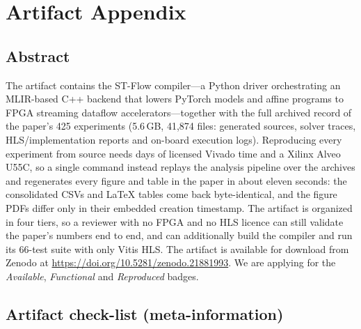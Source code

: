 %
%
%

\appendix
\section{Artifact Appendix}

\subsection{Abstract}

The artifact contains the ST-Flow compiler---a Python driver orchestrating an MLIR-based
C++ backend that lowers PyTorch models and affine programs to FPGA streaming dataflow
accelerators---together with the full archived record of the paper's 425 experiments
(5.6\,GB, 41{,}874 files: generated sources, solver traces, HLS/implementation reports and
on-board execution logs). Reproducing every experiment from source needs days of licensed
Vivado time and a Xilinx Alveo U55C, so a single command instead replays the analysis
pipeline over the archives and regenerates every figure and table in the paper in about
eleven seconds: the consolidated CSVs and \LaTeX{} tables come back byte-identical, and the
figure PDFs differ only in their embedded creation timestamp. The artifact is organized in
four tiers, so a reviewer with no FPGA and no HLS licence can still validate the paper's
numbers end to end, and can additionally build the compiler and run its 66-test suite with
only Vitis HLS. The artifact is available for download from Zenodo at \url{https://doi.org/10.5281/zenodo.21881993}. We are applying for the \emph{Available}, \emph{Functional} and
\emph{Reproduced} badges.

\subsection{Artifact check-list (meta-information)}

